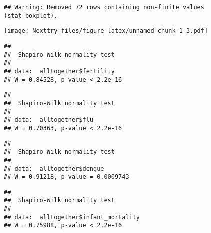\documentclass[
]{book}
\newenvironment{Shaded}{\begin{snugshade}}{\end{snugshade}}
\newcommand{\FunctionTok}[1]{\textcolor[rgb]{0.00,0.00,0.00}{#1}}
\newcommand{\NormalTok}[1]{#1}
\newcommand{\SpecialCharTok}[1]{\textcolor[rgb]{0.00,0.00,0.00}{#1}}
\begin{document}
\begin{verbatim}
## Warning: Removed 72 rows containing non-finite values (stat_boxplot).
\end{verbatim}

\texttt{[image: Nexttry\_files/figure-latex/unnamed-chunk-1-3.pdf]}

\begin{Shaded}
\end{Shaded}

\begin{verbatim}
## 
##  Shapiro-Wilk normality test
## 
## data:  alltogether$fertility
## W = 0.84528, p-value < 2.2e-16
\end{verbatim}

\begin{Shaded}
\end{Shaded}

\begin{verbatim}
## 
##  Shapiro-Wilk normality test
## 
## data:  alltogether$flu
## W = 0.70363, p-value < 2.2e-16
\end{verbatim}

\begin{Shaded}
\end{Shaded}

\begin{verbatim}
## 
##  Shapiro-Wilk normality test
## 
## data:  alltogether$dengue
## W = 0.91218, p-value = 0.0009743
\end{verbatim}

\begin{Shaded}
\end{Shaded}

\begin{verbatim}
## 
##  Shapiro-Wilk normality test
## 
## data:  alltogether$infant_mortality
## W = 0.75988, p-value < 2.2e-16
\end{verbatim}
\end{document}
